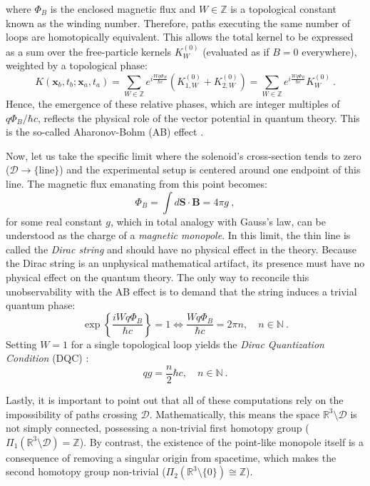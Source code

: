 \documentclass[a4paper,11pt]{article}
\begin{document}
where $\Phi_B$ is the enclosed magnetic flux and $W \in \mathbb{Z}$ is a topological constant known as the winding number. Therefore, paths executing the same number of loops are homotopically equivalent. This allows the total kernel to be expressed as a sum over the free-particle kernels $K_W^{(0)}$ (evaluated as if $B=0$ everywhere), weighted by a topological phase:
 \begin{equation}
    K(\boldsymbol x_b, t_b; \boldsymbol x_a, t_a) = \sum_{W \in \mathbb{Z}} e^{i \frac{W q \Phi_B}{\hbar c}} \left( K_{1,W}^{(0)} + K_{2,W}^{(0)} \right)= \sum_{W \in \mathbb{Z}} e^{i \frac{W q \Phi_B}{\hbar c}} K_W^{(0)}\ .
 \end{equation}
Hence, the emergence of these relative phases, which are integer multiples of $q\Phi_B / \hbar c$, reflects the physical role of the vector potential in quantum theory. This is the so-called Aharonov-Bohm (AB) effect \cite{AharonovBohm1959}.

Now, let us take the specific limit where the solenoid's cross-section tends to zero ($\mathcal{D} \to \{ \text{line} \}$) and the experimental setup is centered around one endpoint of this line. The magnetic flux emanating from this point becomes:
 \begin{equation}
    \Phi_B = \int d\boldsymbol{S}\cdot\boldsymbol{B} = 4\pi g\ ,
 \end{equation}
 for some real constant $g$, which in total analogy with Gauss's law, can be understood as the charge of a \textit{magnetic monopole}. In this limit, the thin line is called the \textit{Dirac string} and should have no physical effect in the theory. Because the Dirac string is an unphysical mathematical artifact, its presence must have no physical effect on the quantum theory. The only way to reconcile this unobservability with the AB effect is to demand that the string induces a trivial quantum phase:
 \begin{equation}
    \exp\left\{ \frac{i W q \Phi_B}{\hbar c} \right\} = 1 \iff \frac{W q \Phi_B}{\hbar c} = 2\pi n, \quad n \in \mathbb{N}\ .
 \end{equation}
 Setting $W=1$ for a single topological loop yields the \textit{Dirac Quantization Condition} (DQC) \cite{Dirac1931}:
 \begin{equation}
    q g = \frac{n}{2} \hbar c, \quad n \in \mathbb{N}\ .
 \end{equation}

Lastly, it is important to point out that all of these computations rely on the impossibility of paths crossing $\mathcal{D}$. Mathematically, this means the space $\mathbb{R}^3 \setminus \mathcal{D}$ is not simply connected, possessing a non-trivial first homotopy group ($\Pi_1(\mathbb{R}^3 \setminus \mathcal{D}) =\mathbb{Z}$). By contrast, the existence of the point-like monopole itself is a consequence of removing a singular origin from spacetime, which makes the second homotopy group non-trivial ($\Pi_2(\mathbb{R}^3 \setminus \{0\}) \cong \mathbb{Z}$).
\end{document}
